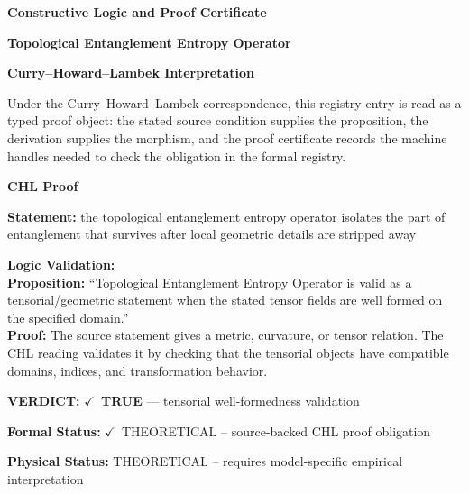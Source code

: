 \clearpage
\begingroup\tzpsupportsetup
\noindent\textbf{\fontsize{10.8pt}{12.8pt}\selectfont [ID 0107] Constructive Logic and Proof Certificate}\par
\noindent\textbf{\fontsize{10pt}{12pt}\selectfont Topological Entanglement Entropy Operator}\par
\vspace{0.45em}
\begingroup
\footnotesize
\setlength{\parskip}{0.22em}
\setlength{\parindent}{0pt}
\noindent\textbf{Curry--Howard--Lambek Interpretation}\par
Under the Curry--Howard--Lambek correspondence, this registry entry is read as a typed proof
object: the stated source condition supplies the proposition, the derivation supplies the
morphism, and the proof certificate records the machine handles needed to check the obligation
in the formal registry.

\vspace{0.45em}
\noindent\textbf{CHL Proof}\par
\textbf{Statement:} the topological entanglement entropy operator isolates the part of entanglement that
survives after local geometric details are stripped away

\textbf{Logic Validation:}\\
\textbf{Proposition:} ``Topological Entanglement Entropy Operator is valid as a tensorial/geometric statement
when the stated tensor fields are well formed on the specified domain.''\\
\textbf{Proof:} The source statement gives a metric, curvature, or tensor relation. The CHL reading
validates it by checking that the tensorial objects have compatible domains, indices,
and transformation behavior.

\textbf{VERDICT:} \ensuremath{\checkmark}\ \textbf{TRUE} --- tensorial well-formedness validation

\textbf{Formal Status:} \ensuremath{\checkmark}\ THEORETICAL -- source-backed CHL proof obligation

\textbf{Physical Status:} THEORETICAL -- requires model-specific empirical interpretation
\par\vspace{0.45em}
\par
\ifTZPDarkEdition
{}
\fi
\endgroup
\endgroup
